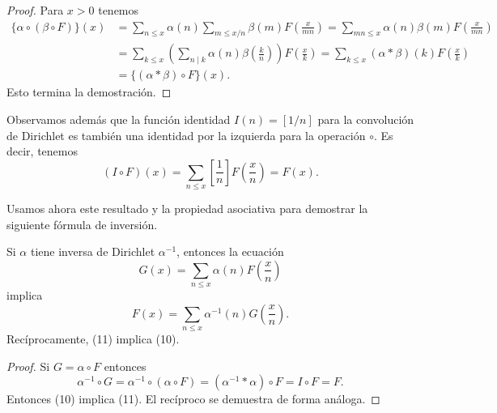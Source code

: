 \documentclass[12pt,a4paper]{book}
\begin{document}
    \begin{proof}
        Para $x>0$ tenemos
        \begin{align*}
            \{\alpha\circ(\beta\circ F)\}(x)&=\sum_{n\leq x}\alpha(n)\sum_{m\leq x/n}
            \beta(m)F\left(\frac{x}{mn}\right)=\sum_{mn\leq x}\alpha(n)\beta(m)F\left(\frac{x}{mn}\right)\\
            &=\sum_{k\leq x}\left(\sum_{n\mid k}\alpha(n)\beta\left(\frac{k}{n}\right)\right)
            F\left(\frac{x}{k}\right)=\sum_{k\leq x}(\alpha*\beta)(k)F\left(\frac{x}{k}\right)\\
            &=\{(\alpha*\beta)\circ F\}(x).
        \end{align*}
        Esto termina la demostración.
    \end{proof}

    Observamos además que la función identidad $I(n)=[1/n]$ para la convolución de
    Dirichlet es también una identidad por la izquierda para la operación $\circ$. Es
    decir, tenemos
    \begin{equation*}
        (I\circ F)(x)=\sum_{n\leq x}\left[\frac{1}{n}\right]F\left(\frac{x}{n}\right)=F(x).
    \end{equation*}

    Usamos ahora este resultado y la propiedad asociativa para demostrar la siguiente
    fórmula de inversión.

    \begin{teorema}
        Si $\alpha$ tiene inversa de Dirichlet $\alpha^{-1}$, entonces la ecuación
        \begin{equation}
            G(x)=\sum_{n\leq x}\alpha(n)F\left(\frac{x}{n}\right)
        \end{equation}
        implica
        \begin{equation}
            F(x)=\sum_{n\leq x}\alpha^{-1}(n)G\left(\frac{x}{n}\right).
        \end{equation}
        Recíprocamente, (11) implica (10).
    \end{teorema}

    \begin{proof}
        Si $G=\alpha\circ F$ entonces
        \begin{equation*}
            \alpha^{-1}\circ G=\alpha^{-1}\circ(\alpha\circ F)=(\alpha^{-1}*\alpha)\circ F
            =I\circ F=F.
        \end{equation*}
        Entonces (10) implica (11). El recíproco se demuestra de forma análoga.
    \end{proof}
\end{document}
